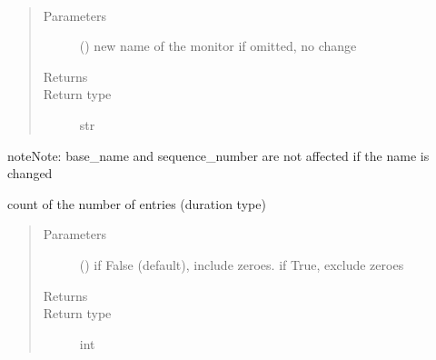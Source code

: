 \documentclass[letterpaper,10pt,english]{sphinxmanual}
\begin{document}
\begin{fulllineitems}
\begin{fulllineitems}
\begin{quote}
\begin{description}
\end{description}\end{quote}

\end{fulllineitems}


\begin{fulllineitems}
\label{\detokenize{Reference:salabim.MonitorTimestamp.name}}~\begin{quote}\begin{description}
\item[{Parameters}] \leavevmode
{} () \textendash{} new name of the monitor
if omitted, no change

\item[{Returns}] \leavevmode
{}

\item[{Return type}] \leavevmode
str

\end{description}\end{quote}

\begin{sphinxadmonition}{note}{Note:}
base\_name and sequence\_number are not affected if the name is changed
\end{sphinxadmonition}

\end{fulllineitems}


\begin{fulllineitems}
\label{\detokenize{Reference:salabim.MonitorTimestamp.number_of_entries}}
count of the number of entries (duration type)
\begin{quote}\begin{description}
\item[{Parameters}] \leavevmode
{} () \textendash{} if False (default), include zeroes. if True, exclude zeroes

\item[{Returns}] \leavevmode
{}

\item[{Return type}] \leavevmode
int


\end{description}
\end{quote}
\end{fulllineitems}
\end{fulllineitems}
\end{document}
